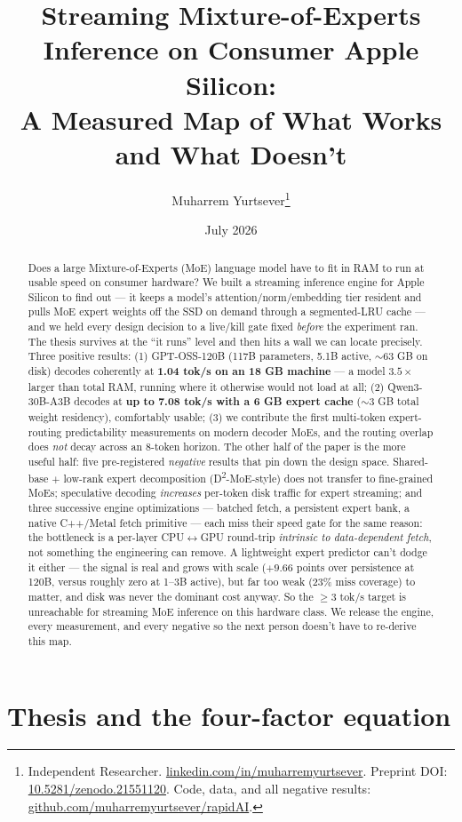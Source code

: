 \documentclass[11pt]{article}
\title{Streaming Mixture-of-Experts Inference on Consumer Apple Silicon:\\
A Measured Map of What Works and What Doesn't}
\author{Muharrem Yurtsever\thanks{Independent Researcher.
\href{https://www.linkedin.com/in/muharremyurtsever/}{linkedin.com/in/muharremyurtsever}.
Preprint DOI: \href{https://doi.org/10.5281/zenodo.21551120}{10.5281/zenodo.21551120}. Code, data, and all negative results: \href{https://github.com/muharremyurtsever/rapidAI}{github.com/muharremyurtsever/rapidAI}.}}
\date{July 2026}
\begin{document}
\maketitle

\begin{abstract}
Does a large Mixture-of-Experts (MoE) language model have to fit in RAM to run at usable speed on consumer hardware? We built a streaming inference engine for Apple Silicon to find out --- it keeps a model's attention/norm/embedding tier resident and pulls MoE expert weights off the SSD on demand through a segmented-LRU cache --- and we held every design decision to a live/kill gate fixed \emph{before} the experiment ran. The thesis survives at the ``it runs'' level and then hits a wall we can locate precisely. Three positive results: (1) GPT-OSS-120B (117B parameters, 5.1B active, ${\sim}63$ GB on disk) decodes coherently at \textbf{1.04 tok/s on an 18 GB machine} --- a model $3.5\times$ larger than total RAM, running where it otherwise would not load at all; (2) Qwen3-30B-A3B decodes at \textbf{up to 7.08 tok/s with a 6 GB expert cache} (${\sim}3$ GB total weight residency), comfortably usable; (3) we contribute the first multi-token expert-routing predictability measurements on modern decoder MoEs, and the routing overlap does \emph{not} decay across an 8-token horizon. The other half of the paper is the more useful half: five pre-registered \emph{negative} results that pin down the design space. Shared-base $+$ low-rank expert decomposition (D\textsuperscript{2}-MoE-style) does not transfer to fine-grained MoEs; speculative decoding \emph{increases} per-token disk traffic for expert streaming; and three successive engine optimizations --- batched fetch, a persistent expert bank, a native C++/Metal fetch primitive --- each miss their speed gate for the same reason: the bottleneck is a per-layer CPU$\leftrightarrow$GPU round-trip \emph{intrinsic to data-dependent fetch}, not something the engineering can remove. A lightweight expert predictor can't dodge it either --- the signal is real and grows with scale ($+9.66$ points over persistence at 120B, versus roughly zero at 1--3B active), but far too weak (23\% miss coverage) to matter, and disk was never the dominant cost anyway. So the ${\ge}3$ tok/s target is unreachable for streaming MoE inference on this hardware class. We release the engine, every measurement, and every negative so the next person doesn't have to re-derive this map.
\end{abstract}

\section{Thesis and the four-factor equation}
\end{document}
